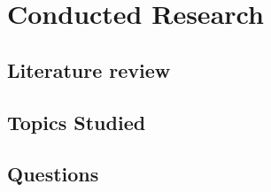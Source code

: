 \chapter{Conducted Research}

\section{Literature review}

\section{Topics Studied}

\section{Questions}

